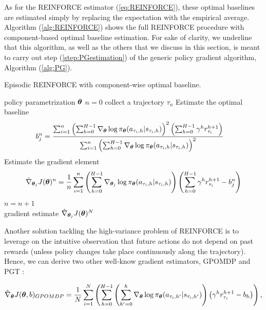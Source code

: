 As for the REINFORCE estimator (\ref{eq:REINFORCE}), these optimal baselines are estimated simply by replacing the expectation with the empirical average. Algorithm (\ref{alg:REINFORCE}) shows the full REINFORCE procedure with component-based optimal baseline estimation. For sake of clarity, we underline that this algorithm, as well as the others that we discuss in this section, is meant to carry out step (\ref{step:PGestimation}) of the generic policy gradient algorithm, \ie Algorithm (\ref{alg:PG}).
\begin{algorithm}[t]
	\caption{Episodic REINFORCE with component-wise optimal baseline.}
	\label{alg:REINFORCE}
	\begin{algorithmic}[1]
	 policy parametrization $\boldsymbol{\theta}$
	 $n=0$
		\State collect a trajectory $\tau_n$
			\State Estimate the optimal baseline 
			\begin{align*}
			b_{j}^{n} &= \frac{\sum_{i=1}^{n}\left(\sum_{h=0}^{H-1}\nabla_{\boldsymbol{\theta}}\log\pi_{\boldsymbol{\theta}}(a_{\tau_i,h}|s_{\tau_i,h})\right)^2\left(\sum_{h=0}^{H-1}\gamma^h r^{h+1}_{\tau_i}\right)}{\sum_{i=1}^{n}\left(\sum_{h=0}^{H-1}\nabla_{\boldsymbol{\theta}}\log\pi_{\boldsymbol{\theta}}(a_{\tau_i,h}|s_{\tau_i,h})\right)^2}
			\end{align*}
			\State Estimate the gradient element
			\begin{align*}
\hat{\nabla}_{\boldsymbol{\theta}_j}J(\boldsymbol{\theta})^{n}= \frac{1}{n}\sum_{i=1}^{n}\left(\sum_{h=0}^{H-1}\nabla_{\boldsymbol{\theta}_j}\log\pi_{\boldsymbol{\theta}}(a_{\tau_i,h}|s_{\tau_i,h}) \right)\left(\sum_{h=0}^{H-1}\gamma^h r^{h+1}_{\tau_i} - b_j^n \right)
\end{align*}
		\EndFor
		\State $n=n+1$
	\EndWhile \\
	\Return gradient estimate $\hat{\nabla}_{\boldsymbol{\theta}_j}J(\boldsymbol{\theta})^{N}$
	\end{algorithmic}
\end{algorithm}

Another solution tackling the high-variance problem of REINFORCE is to leverage on the intuitive observation that future actions do not depend on past rewards (unless policy changes take place continuously along the trajectory). Hence, we can derive two other well-know gradient estimators, \gls{GPOMDP} \cite{baxter2001infinite} and PGT \cite{sutton2000policy}:

\begin{align}
\hat{\nabla}_{\boldsymbol{\theta}}J(\boldsymbol{\theta}, b)_{GPOMDP} = \frac{1}{N}\sum_{i=1}^{N}\left(\sum_{h=0}^{H-1}\left(\sum_{h'=0}^{h}\nabla_{\boldsymbol{\theta}}\log\pi_{\boldsymbol{\theta}}(a_{\tau_i,h'}|s_{\tau_i,h'})\right)\left(\gamma^h r^{h+1}_{\tau_i} - b_h \right)\right),
\end{align}


